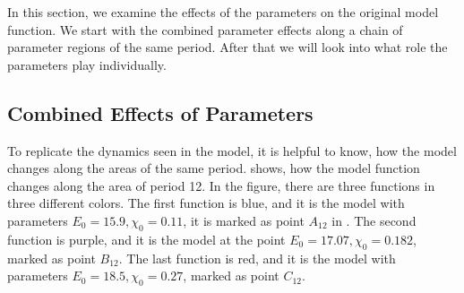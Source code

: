 In this section, we examine the effects of the parameters on the original model function.
We start with the combined parameter effects along a chain of parameter regions of the same period.
After that we will look into what role the parameters play individually.

\subsection{Combined Effects of Parameters}
\label{sec:setup.char.paramfx.combined}
\label{sec:yunus.param.effects.combined}

To replicate the dynamics seen in the model, it is helpful to know, how the model changes along the areas of the same period.
 shows, how the model function changes along the area of period 12.
In the figure, there are three functions in three different colors.
The first function is blue, and it is the model with parameters $E_0 = 15.9, \chi_0 = 0.11$, it is marked as point $A_12$ in .
The second function is purple, and it is the model at the point $E_0 = 17.07, \chi_0 = 0.182$, marked as point $B_{12}$.
The last function is red, and it is the model with parameters $E_0 = 18.5, \chi_0 = 0.27$, marked as point $C_{12}$.

